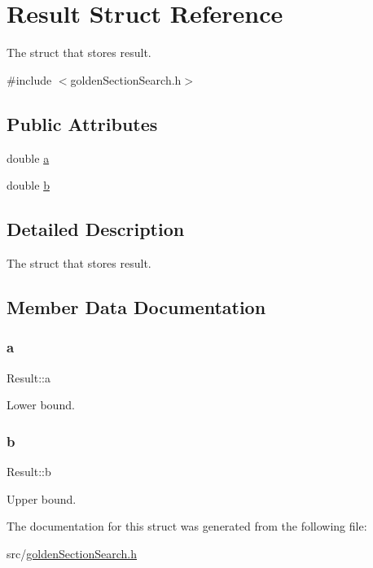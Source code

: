 \hypertarget{struct_result}{}\section{Result Struct Reference}
\label{struct_result}


The struct that stores result.  




{\ttfamily \#include $<$golden\+Section\+Search.\+h$>$}

\subsection*{Public Attributes}
\begin{DoxyCompactItemize}
\item 
double \mbox{\hyperlink{struct_result_ae71a2de0e642ecd81d695d3171d1c577}{a}}
\item 
double \mbox{\hyperlink{struct_result_ac790d92ce6d4b45e26415bcd904ff966}{b}}
\end{DoxyCompactItemize}


\subsection{Detailed Description}
The struct that stores result. 

\subsection{Member Data Documentation}
\mbox{\label{struct_result_ae71a2de0e642ecd81d695d3171d1c577}} 
\subsubsection{\texorpdfstring{a}{a}}
{\footnotesize\ttfamily Result\+::a}

Lower bound. \mbox{\label{struct_result_ac790d92ce6d4b45e26415bcd904ff966}} 
\subsubsection{\texorpdfstring{b}{b}}
{\footnotesize\ttfamily Result\+::b}

Upper bound. 

The documentation for this struct was generated from the following file\+:\begin{DoxyCompactItemize}
\item 
src/\mbox{\hyperlink{golden_section_search_8h}{golden\+Section\+Search.\+h}}\end{DoxyCompactItemize}
